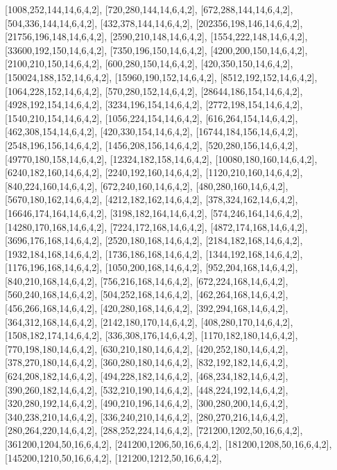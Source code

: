 \documentclass[12pt]{amsart}
\begin{document}
[1008,252,144,14,6,4,2],   [720,280,144,14,6,4,2],   [672,288,144,14,6,4,2],   [504,336,144,14,6,4,2],   [432,378,144,14,6,4,2],   [202356,198,146,14,6,4,2],
[21756,196,148,14,6,4,2],   [2590,210,148,14,6,4,2],   [1554,222,148,14,6,4,2],   [33600,192,150,14,6,4,2],   [7350,196,150,14,6,4,2],   [4200,200,150,14,6,4,2],
[2100,210,150,14,6,4,2],   [600,280,150,14,6,4,2],   [420,350,150,14,6,4,2],   [150024,188,152,14,6,4,2],   [15960,190,152,14,6,4,2],   [8512,192,152,14,6,4,2],
[1064,228,152,14,6,4,2],   [570,280,152,14,6,4,2],   [28644,186,154,14,6,4,2],   [4928,192,154,14,6,4,2],   [3234,196,154,14,6,4,2],   [2772,198,154,14,6,4,2],
[1540,210,154,14,6,4,2],   [1056,224,154,14,6,4,2],   [616,264,154,14,6,4,2],   [462,308,154,14,6,4,2],   [420,330,154,14,6,4,2],   [16744,184,156,14,6,4,2],
[2548,196,156,14,6,4,2],   [1456,208,156,14,6,4,2],   [520,280,156,14,6,4,2],   [49770,180,158,14,6,4,2],   [12324,182,158,14,6,4,2],   [10080,180,160,14,6,4,2],
[6240,182,160,14,6,4,2],   [2240,192,160,14,6,4,2],   [1120,210,160,14,6,4,2],   [840,224,160,14,6,4,2],   [672,240,160,14,6,4,2],   [480,280,160,14,6,4,2],
[5670,180,162,14,6,4,2],   [4212,182,162,14,6,4,2],   [378,324,162,14,6,4,2],   [16646,174,164,14,6,4,2],   [3198,182,164,14,6,4,2],   [574,246,164,14,6,4,2],
[14280,170,168,14,6,4,2],   [7224,172,168,14,6,4,2],   [4872,174,168,14,6,4,2],   [3696,176,168,14,6,4,2],   [2520,180,168,14,6,4,2],   [2184,182,168,14,6,4,2],
[1932,184,168,14,6,4,2],   [1736,186,168,14,6,4,2],   [1344,192,168,14,6,4,2],   [1176,196,168,14,6,4,2],   [1050,200,168,14,6,4,2],   [952,204,168,14,6,4,2],
[840,210,168,14,6,4,2],   [756,216,168,14,6,4,2],   [672,224,168,14,6,4,2],   [560,240,168,14,6,4,2],   [504,252,168,14,6,4,2],   [462,264,168,14,6,4,2],
[456,266,168,14,6,4,2],   [420,280,168,14,6,4,2],   [392,294,168,14,6,4,2],   [364,312,168,14,6,4,2],   [2142,180,170,14,6,4,2],   [408,280,170,14,6,4,2],
[1508,182,174,14,6,4,2],   [336,308,176,14,6,4,2],   [1170,182,180,14,6,4,2],   [770,198,180,14,6,4,2],   [630,210,180,14,6,4,2],   [420,252,180,14,6,4,2],
[378,270,180,14,6,4,2],   [360,280,180,14,6,4,2],   [832,192,182,14,6,4,2],   [624,208,182,14,6,4,2],   [494,228,182,14,6,4,2],   [468,234,182,14,6,4,2],
[390,260,182,14,6,4,2],   [532,210,190,14,6,4,2],   [448,224,192,14,6,4,2],   [320,280,192,14,6,4,2],   [490,210,196,14,6,4,2],   [300,280,200,14,6,4,2],
[340,238,210,14,6,4,2],   [336,240,210,14,6,4,2],   [280,270,216,14,6,4,2],   [280,264,220,14,6,4,2],   [288,252,224,14,6,4,2],   [721200,1202,50,16,6,4,2],
[361200,1204,50,16,6,4,2],   [241200,1206,50,16,6,4,2],   [181200,1208,50,16,6,4,2],   [145200,1210,50,16,6,4,2],   [121200,1212,50,16,6,4,2],
\end{document}
